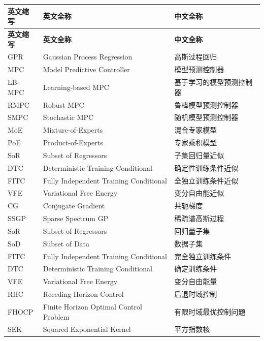 \cleardoublepage
{}
\begin{center}
    \begin{longtable}{m{2cm}m{8cm}m{5cm}}
        \toprule
        \textbf{英文缩写}&\textbf{英文全称}&\textbf{中文全称}\\
        \midrule
        \endfirsthead
        \toprule
        \textbf{英文缩写}&\textbf{英文全称}&\textbf{中文全称}\\
        \midrule
        \endhead 
        \bottomrule
        \endfoot
        \bottomrule
        \endlastfoot
        GPR & Gaussian Process Regression & 高斯过程回归 \\
        MPC & Model Predictive Controller & 模型预测控制器 \\
        LB-MPC & Learning-based MPC & 基于学习的模型预测控制器 \\
        RMPC & Robust MPC & 鲁棒模型预测控制器 \\
        SMPC & Stochastic MPC & 随机模型预测控制器 \\
        MoE & Mixture-of-Experts & 混合专家模型 \\
        PoE & Product-of-Experts & 专家乘积模型 \\
        SoR & Subset of Regressors & 子集回归量近似 \\
        DTC & Deterministic Training Conditional & 确定性训练条件近似 \\
        FITC & Fully Independent Training Conditional & 全独立训练条件近似 \\
        VFE & Variational Free Energy & 变分自由能近似 \\
        CG & Conjugate Gradient & 共轭梯度 \\
        SSGP & Sparse Spectrum GP & 稀疏谱高斯过程 \\
        SoR & Subset of Regressors & 回归量子集 \\
        SoD & Subset of Data & 数据子集 \\ 
        FITC & Fully Independent Training Conditional & 完全独立训练条件 \\ 
        DTC & Deterministic Training Conditional & 确定训练条件 \\ 
        VFE & Variational Free Energy & 变分自由能量 \\
        RHC & Receding Horizon Control & 后退时域控制 \\
        FHOCP & Finite Horizon Optimal Control Problem & 有限时域最优控制问题 \\ 
        SEK & Squared Exponential Kernel & 平方指数核 \\
	\end{longtable}
\end{center}
